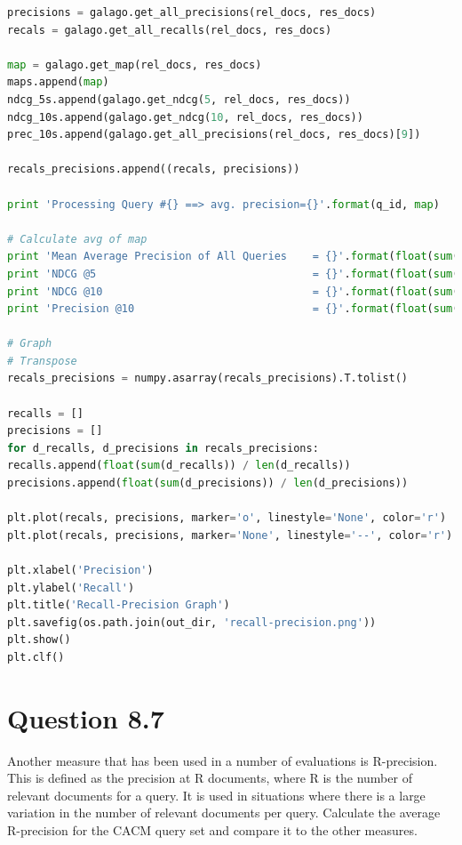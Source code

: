 \documentclass[letterpaper,11pt]{article}
\begin{document}
\begin{lstlisting}[language=python, caption={Code for question 8.5}, label={lst:85}]
precisions = galago.get_all_precisions(rel_docs, res_docs)
recals = galago.get_all_recalls(rel_docs, res_docs)

map = galago.get_map(rel_docs, res_docs)
maps.append(map)
ndcg_5s.append(galago.get_ndcg(5, rel_docs, res_docs))
ndcg_10s.append(galago.get_ndcg(10, rel_docs, res_docs))
prec_10s.append(galago.get_all_precisions(rel_docs, res_docs)[9])

recals_precisions.append((recals, precisions))

print 'Processing Query #{} ==> avg. precision={}'.format(q_id, map)

# Calculate avg of map
print 'Mean Average Precision of All Queries    = {}'.format(float(sum(maps)) / len(maps))
print 'NDCG @5                                  = {}'.format(float(sum(ndcg_5s)) / len(ndcg_5s))
print 'NDCG @10                                 = {}'.format(float(sum(ndcg_10s)) / len(ndcg_10s))
print 'Precision @10                            = {}'.format(float(sum(prec_10s)) / len(prec_10s))

# Graph
# Transpose
recals_precisions = numpy.asarray(recals_precisions).T.tolist()

recalls = []
precisions = []
for d_recalls, d_precisions in recals_precisions:
recalls.append(float(sum(d_recalls)) / len(d_recalls))
precisions.append(float(sum(d_precisions)) / len(d_precisions))

plt.plot(recals, precisions, marker='o', linestyle='None', color='r')
plt.plot(recals, precisions, marker='None', linestyle='--', color='r')

plt.xlabel('Precision')
plt.ylabel('Recall')
plt.title('Recall-Precision Graph')
plt.savefig(os.path.join(out_dir, 'recall-precision.png'))
plt.show()
plt.clf()


\end{lstlisting}



\noindent\makebox[\linewidth]{\rule{\textwidth}{0.4pt}}

\section*{Question 8.7}
\begin{spverbatim}
Another measure that has been used in a number of evaluations is R-precision.
This is defined as the precision at R documents, where R is the number of relevant
documents for a query. It is used in situations where there is a large variation in
the number of relevant documents per query. Calculate the average R-precision
for the CACM query set and compare it to the other measures.
\end{spverbatim}
\end{document}
